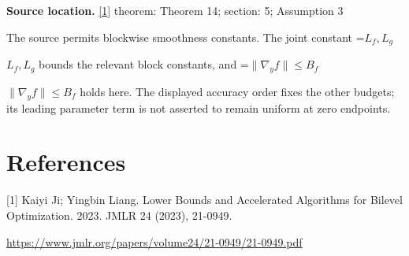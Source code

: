\documentclass[10pt,a4paper]{article}
\newcommand{\AtlasMath}[1]{\par\begingroup\centering\setbox0=\hbox{$\displaystyle #1$}\ifdim\wd0>1.4\linewidth\typeout{ATLAS WIDE FORMULA: \the\wd0}\fi\ifdim\wd0>\linewidth\resizebox{\linewidth}{!}{\box0}\else\box0\fi\par\endgroup}
\newcommand{\AtlasInlineMath}[1]{\begingroup\setbox0=\hbox{$#1$}\ifdim\wd0>.4\linewidth\endgroup\AtlasMath{#1}\else\endgroup$#1$\fi}
\begin{document}
\textbf{Source location.} \href{https://www.jmlr.org/papers/volume24/21-0949/21-0949.pdf}{[1]} theorem: Theorem 14; section: 5; Assumption 3

The source permits blockwise smoothness constants. The joint constant \AtlasInlineMath{L_f,L_g} bounds the relevant block constants, and \AtlasInlineMath{\|\nabla_yf\|\le B_f} holds here. The displayed accuracy order fixes the other budgets; its leading parameter term is not asserted to remain uniform at zero endpoints.

\section{References}
[1] Kaiyi Ji; Yingbin Liang. Lower Bounds and Accelerated Algorithms for Bilevel Optimization. 2023. JMLR 24 (2023), 21-0949.

\url{https://www.jmlr.org/papers/volume24/21-0949/21-0949.pdf}
\end{document}
